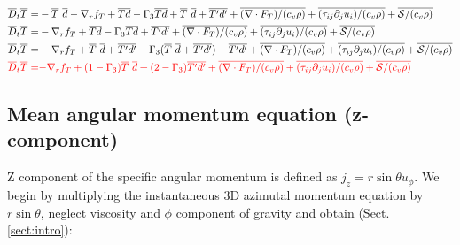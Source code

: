 \documentclass[10pt,paper=a4]{report}
\newcommand{\eht}{\overline}
\begin{document}
\begin{align}
\eht{D}_t \eht{T} = & -\eht{T}\ \eht{d} -\nabla_r f_T + \eht{Td}  -\Gamma_3 \eht{Td} + \eht{T} \ \eht{d} + \eht{T'd'} + \eht{(\nabla \cdot F_T)/(c_v \rho)} + \eht{(\tau_{ij}\partial_j u_i)/(c_v \rho)} + \eht{{\mathcal S}/(c_v \rho)} \\
\eht{D}_t \eht{T} = & -\nabla_r f_T + \eht{Td}  -\Gamma_3 \eht{Td} + \eht{T'd'} + \eht{(\nabla \cdot F_T)/(c_v \rho)} + \eht{(\tau_{ij}\partial_j u_i)/(c_v \rho)} + \eht{{\mathcal S}/(c_v \rho)} \\
\eht{D}_t \eht{T} = & -\nabla_r f_T + \eht{T} \ \eht{d} + \eht{T'd'} -\Gamma_3 (\eht{T} \ \eht{d} + \eht{T'd'}) + \eht{T'd'} + \eht{(\nabla \cdot F_T)/(c_v \rho)} + \eht{(\tau_{ij}\partial_j u_i)/(c_v \rho)} + \eht{{\mathcal S}/(c_v \rho)}\\
{\color{red} \eht{D}_t \eht{T} =} & {\color{red}-\nabla_r f_T + (1-\Gamma_3)\eht{T} \ \eht{d} + (2-\Gamma_3)\eht{T'd'} + \eht{(\nabla \cdot F_T)/(c_v \rho)} + \eht{(\tau_{ij}\partial_j u_i)/(c_v \rho)} + \eht{{\mathcal S}/(c_v \rho)}}
\end{align}

\fontsize{12pt}{20pt}

\subsection{Mean angular momentum equation (z-component)}

Z component of the specific angular momentum is defined as  $j_z = r \sin{\theta} u_\phi$. We begin by multiplying the instantaneous 3D azimutal momentum equation by $r \sin{\theta}$, neglect viscosity and $\phi$ component of gravity and obtain (Sect.\ref{sect:intro}):

\fontsize{9pt}{20pt}
\end{document}

